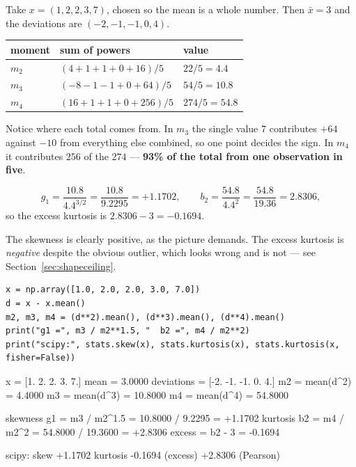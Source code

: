 \documentclass[11pt]{article}
\begin{document}
\begin{worked}
Take $x = (1, 2, 2, 3, 7)$, chosen so the mean is a whole number. Then
$\bar{x} = 3$ and the deviations are $(-2, -1, -1, 0, 4)$.

\medskip
\begin{tabular}{@{}lll@{}}
\toprule
moment & sum of powers & value\\
\midrule
$m_2$ & $(4 + 1 + 1 + 0 + 16)/5$   & $22/5 = 4.4$\\
$m_3$ & $(-8 - 1 - 1 + 0 + 64)/5$  & $54/5 = 10.8$\\
$m_4$ & $(16 + 1 + 1 + 0 + 256)/5$ & $274/5 = 54.8$\\
\bottomrule
\end{tabular}

\medskip
Notice where each total comes from. In $m_3$ the single value $7$ contributes
$+64$ against $-10$ from everything else combined, so one point decides the
sign. In $m_4$ it contributes $256$ of the $274$ --- \textbf{93\% of the
total from one observation in five}.

\[
  g_1 = \frac{10.8}{4.4^{3/2}} = \frac{10.8}{9.2295} = +1.1702,
  \qquad
  b_2 = \frac{54.8}{4.4^{2}} = \frac{54.8}{19.36} = 2.8306,
\]
so the excess kurtosis is $2.8306 - 3 = -0.1694$.

The skewness is clearly positive, as the picture demands. The excess kurtosis
is \emph{negative} despite the obvious outlier, which looks wrong and is not
--- see Section~\ref{sec:shapeceiling}.
\end{worked}

\begin{lstlisting}
x = np.array([1.0, 2.0, 2.0, 3.0, 7.0])
d = x - x.mean()
m2, m3, m4 = (d**2).mean(), (d**3).mean(), (d**4).mean()
print("g1 =", m3 / m2**1.5, "  b2 =", m4 / m2**2)
print("scipy:", stats.skew(x), stats.kurtosis(x), stats.kurtosis(x, fisher=False))
\end{lstlisting}
\begin{codeout}
x    = [1. 2. 2. 3. 7.]
mean = 3.0000   deviations = [-2. -1. -1.  0.  4.]
m2 = mean(d^2) = 4.4000
m3 = mean(d^3) = 10.8000
m4 = mean(d^4) = 54.8000

skewness g1 = m3 / m2^1.5 = 10.8000 / 9.2295 = +1.1702
kurtosis b2 = m4 / m2^2   = 54.8000 / 19.3600 = +2.8306
excess      = b2 - 3      = -0.1694

scipy:  skew +1.1702   kurtosis -0.1694 (excess)   +2.8306 (Pearson)
\end{codeout}
\end{document}
